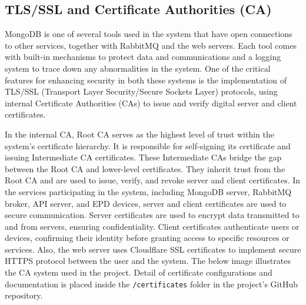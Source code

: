 \documentclass[../Main.tex]{subfiles}
\begin{document}
\subsection{TLS/SSL and Certificate Authorities (CA)}
MongoDB is one of several tools used in the system that have open connections to other services, together with RabbitMQ and the web servers. Each tool comes with built-in mechanisms to protect data and communications and a logging system to trace down any abnormalities in the system. One of the critical features for enhancing security in both these systems is the implementation of TLS/SSL (Transport Layer Security/Secure Sockets Layer) protocols, using internal Certificate Authorities (CAs) to issue and verify digital server and client certificates.

In the internal CA, Root CA serves as the highest level of trust within the system's certificate hierarchy. It is responsible for self-signing its certificate and issuing Intermediate CA certificates. These Intermediate CAs bridge the gap between the Root CA and lower-level certificates. They inherit trust from the Root CA and are used to issue, verify, and revoke server and client certificates. In the services participating in the system, including MongoDB server, RabbitMQ broker, API server, and \gls{EPD} devices, server and client certificates are used to secure communication. Server certificates are used to encrypt data transmitted to and from servers, ensuring confidentiality. Client certificates authenticate users or devices, confirming their identity before granting access to specific resources or services. Also, the web server uses Cloudflare SSL certificates to implement secure HTTPS protocol between the user and the system. The below image illustrates the CA system used in the project. Detail of certificate configurations and documentation is placed inside the \verb|/certificates| folder in the project's GitHub repository.
\end{document}
